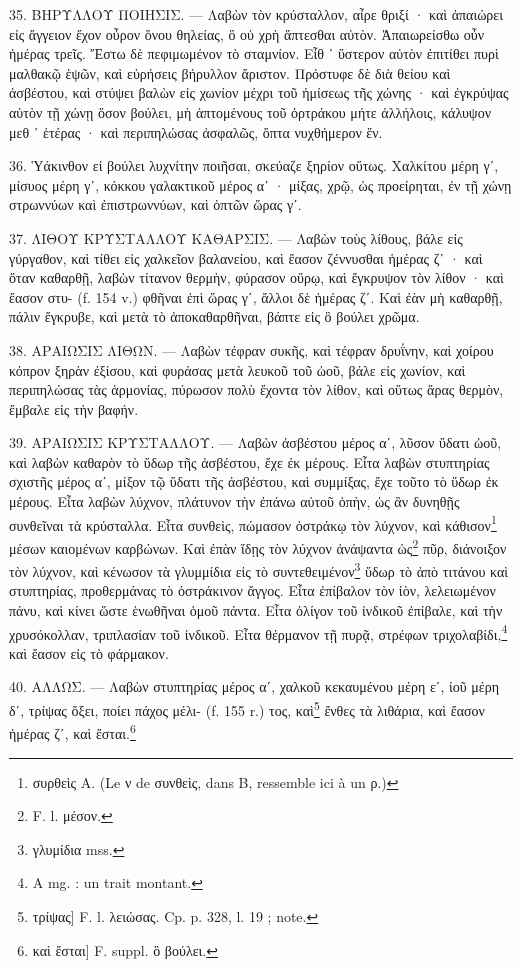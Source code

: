 \documentclass[a4paper, 11pt, oneside, polutonikogreek, french]{article}
\begin{document}
35. ΒΗΡΥΛΛΟΥ ΠΟΙΗΣΙΣ. --- Λαβὼν τὸν κρύσταλλον, αἶρε θριξί · καὶ ἀπαιώρει εἰς ἄγγειον ἔχον οὖρον ὅνου θηλείας, ὃ οὐ χρὴ ἅπτεσθαι αὐτὸν. Ἀπαιωρείσθω οὖν ἡμέρας τρεῖς. Ἔστω δὲ πεφιμωμένον τὸ σταμνίον. Εἶθ ᾽ ὕστερον αὐτὸν ἐπιτίθει πυρὶ μαλθακῷ ἑψῶν, καὶ εὑρήσεις βήρυλλον ἄριστον. Πρόστυφε δὲ διὰ θείου καὶ ἀσβέστου, καὶ στύψει βαλὼν εἰς χωνίον μέχρι τοῦ ἡμίσεως τῆς χώνης · καὶ ἐγκρύψας αὐτὸν τῇ χώνῃ ὅσον βούλει, μὴ ἁπτομένους τοῦ ὀρτράκου μήτε ἀλλήλοις, κάλυψον μεθ ᾽ ἑτέρας · καὶ περιπηλώσας ἀσφαλῶς, ὄπτα νυχθήμερον ἕν.

36. Ὑάκινθον εἰ βούλει λυχνίτην ποιῆσαι, σκεύαζε ξηρίον οὕτως. Χαλκίτου μέρη γʹ, μίσυος μέρη γʹ, κόκκου γαλακτικοῦ μέρος αʹ · μίξας, χρῷ, ὡς προείρηται, ἐν τῇ χώνῃ στρωννύων καὶ ἐπιστρωννύων, καὶ ὀπτῶν ὥρας γʹ.

37. ΛΙΘΟΥ ΚΡΥΣΤΑΛΛΟΥ ΚΑΘΑΡΣΙΣ. --- Λαβὼν τοὺς λίθους, βάλε εἰς γύργαθον, καὶ τίθει εἰς χαλκεῖον βαλανείου, καὶ ἔασον ζέννυσθαι ἡμέρας ζʹ · καὶ ὅταν καθαρθῇ, λαβὼν τίτανον θερμὴν, φύρασον οὔρῳ, καὶ ἔγκρυψον τὸν λίθον · καὶ ἔασον στυ- (f. 154 v.) φθῆναι ἐπὶ ὥρας γʹ, ἄλλοι δὲ ἡμέρας ζʹ. Καὶ ἐὰν μὴ καθαρθῇ, πάλιν ἔγκρυβε, καὶ μετὰ τὸ ἀποκαθαρθῆναι, βάπτε εἰς ὃ βούλει χρῶμα.

38. ΑΡΑΙΩΣΙΣ ΛΙΘΩΝ. --- Λαβὼν τέφραν συκῆς, καὶ τέφραν δρυΐνην, καὶ χοίρου κόπρον ξηρὰν ἐξίσου, καὶ φυράσας μετὰ λευκοῦ τοῦ ὠοῦ, βάλε εἰς χωνίον, καὶ περιπηλώσας τὰς ἁρμονίας, πύρωσον πολὺ ἔχοντα τὸν λίθον, καὶ οὕτως ἄρας θερμὸν, ἔμβαλε εἰς τὴν βαφήν.

39. ΑΡΑΙΩΣΙΣ ΚΡΥΣΤΑΛΛΟΥ. --- Λαβὼν ἀσβέστου μέρος αʹ, λῦσον ὕδατι ὠοῦ, καὶ λαβὼν καθαρὸν τὸ ὕδωρ τῆς ἀσβέστου, ἔχε ἐκ μέρους. Εἶτα λαβὼν στυπτηρίας σχιστῆς μέρος αʹ, μίξον τῷ ὕδατι τῆς ἀσβέστου, καὶ συμμίξας, ἔχε τοῦτο τὸ ὕδωρ ἐκ μέρους. Εἶτα λαβὼν λύχνον, πλάτυνον τὴν ἐπάνω αὐτοῦ ὀπὴν, ὡς ἂν δυνηθῇς συνθεῖναι τὰ κρύσταλλα. Εἶτα συνθεὶς, πώμασον ὀστράκῳ τὸν λύχνον, καὶ κάθισον\footnote{συρθεὶς A. (Le ν de συνθεὶς, dans B, ressemble ici à un ρ.)} μέσων καιομένων καρβώνων. Καὶ ἐπὰν ἴδῃς τὸν λύχνον ἀνάψαντα ὡς\footnote{F. l. μέσον.} πῦρ, διάνοιξον τὸν λύχνον, καὶ κένωσον τὰ γλυμμίδια εἰς τὸ συντεθειμένον\footnote{γλυμίδια mss.} ὕδωρ τὸ ἀπὸ τιτάνου καὶ στυπτηρίας, προθερμάνας τὸ ὀστράκινον ἄγγος. Εἶτα ἐπίβαλον τὸν ἰὸν, λελειωμένον πάνυ, καὶ κίνει ὥστε ἑνωθῆναι ὁμοῦ πάντα. Εἶτα ὀλίγον τοῦ ἰνδικοῦ ἐπίβαλε, καὶ τὴν χρυσόκολλαν, τριπλασίαν τοῦ ἰνδικοῦ. Εἶτα θέρμανον τῇ πυρᾷ, στρέφων τριχολαβίδι,\footnote{A mg. : un trait montant.} καὶ ἔασον εἰς τὸ φάρμακον.

40. ΑΛΛΩΣ. --- Λαβὼν στυπτηρίας μέρος αʹ, χαλκοῦ κεκαυμένου μέρη εʹ, ἰοῦ μέρη δʹ, τρίψας ὄξει, ποίει πάχος μέλι- (f. 155 r.) τος, καὶ\footnote{τρίψας] F. l. λειώσας. Cp. p. 328, l. 19 ; note.} ἔνθες τὰ λιθάρια, καὶ ἔασον ἡμέρας ζʹ, καὶ ἔσται.\footnote{καὶ ἔσται] F. suppl. ὃ βούλει.}
\end{document}
